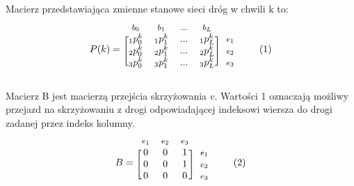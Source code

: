 \documentclass[12pt]{book}
\newcommand\addtag{\refstepcounter{equation}\tag{\theequation}}
\begin{document}
Macierz przedstawiająca zmienne stanowe sieci dróg w chwili k to:
\begin{equation*}
  P(k)=
  \begin{blockarray}{*{4}{c} l}
    \begin{block}{*{4}{>{$\footnotesize}c<{$}} l}
      $b_0$ & $b_1$ & ... & $b_{L}$ \\
    \end{block}
    \begin{block}{[*{4}{c}]>{$\footnotesize}l<{$}}
       _1{p_0^k} & _1{p_1^k} & ... & _1{p_{L}^k} & $e_1$ \\
       _2{p_0^k} & _2{p_1^k} & ... & _2{p_{L}^k} & $e_2$ \\
       _3{p_0^k} & _3{p_1^k} & ... & _3{p_{L}^k} & $e_3$ \\
    \end{block}
  \end{blockarray} \addtag \label{skrz_1_x0}
\end{equation*}


Macierz B jest macierzą przejścia skrzyżowania $v$. Wartości 1 oznaczają możliwy przejazd na skrzyżowaniu z drogi odpowiadającej indeksowi wiersza do drogi zadanej przez indeks kolumny.
\begin{equation*}
  B=
  \begin{blockarray}{*{3}{c} l}
    \begin{block}{*{3}{>{$\footnotesize}c<{$}} l}
     $e_1$ & $e_2$ & $e_3$\\
    \end{block}
    \begin{block}{[*{3}{c}]>{$\footnotesize}l<{$}}
       0 & 0 & 1 & $e_1$ \\
       0 & 0 & 1 & $e_2$ \\
       0 & 0 & 0 & $e_3$ \\
    \end{block}
  \end{blockarray} \addtag
\end{equation*}
\end{document}
